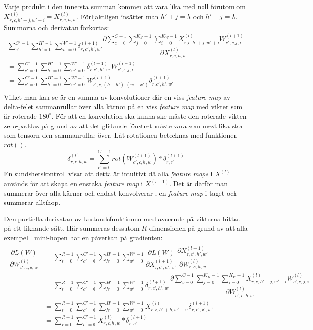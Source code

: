 \documentclass[a4paper,11pt,twoside]{article}
\newcommand*{\pd}[2]{\ensuremath{\dfrac{\partial #1}{\partial #2}}}
\begin{document}
Varje produkt i den innersta summan kommer att vara lika med noll förutom om $X^{(l)}_{r, c, h'+j, w'+i} = X^{(l)}_{r,c,h,w}$. Förljaktligen insätter man $h'+j = h$ och $h'+j = h$. Summorna och derivatan förkortas: \cite{webconv1} \cite{webconv2} \cite{webconv3}
\begin{multline}
\sum^{C'-1}_{c'} \sum^{H'-1}_{h'=0} \sum^{W'-1}_{w'=0} \delta^{(l+1)}_{r,c',h',w'} \pd{\sum^{C-1}_{c=0} \sum^{K_H-1}_{j=0} \sum^{K_W-1}_{i=0} X^{(l)}_{r, c, h'+j, w'+i}W^{(l+1)}_{c', c, j, i}}{X^{(l)}_{r,c,h,w}} \\
	 = \sum^{C'-1}_{c'=0} \sum^{H'-1}_{h'=0} \sum^{W'-1}_{w'=0} \delta^{(l+1)}_{r,c',h',w'} W^{(l+1)}_{c', c, j, i} \\
	 = \sum^{C'-1}_{c'=0} \sum^{H'-1}_{h'=0} \sum^{W'-1}_{w'=0} W^{(l+1)}_{c', c, (h-h'), (w-w')}  \delta^{(l+1)}_{r,c',h',w'}   \\
\end{multline}
Vilket man kan se är en summa av konvolutioner där en viss \textit{feature map} av delta-felet sammanrullar över alla kärnor på en viss \textit{feature map} med vikter som är roterade $180^\circ$. För att en konvolution ska kunna ske måste den roterade vikten zero-paddas på grund av att det glidande fönstret måste vara som mest lika stor som tensorn den sammanrullar över. Låt rotationen betecknas med funktionen $rot()$. \cite{webconv1} \cite{webconv2} \cite{webconv3}
\begin{equation}
\delta^{(l)}_{r,c,h,w} = \sum^{C'-1}_{c'=0} rot(W^{(l+1)}_{c',c,h,w}) * \delta^{(l+1)}_{r,c'}
\end{equation}
En sundshetskontroll visar att detta är intuitivt då alla \textit{feature maps} i $X^{(l)}$ används för att skapa en enstaka \textit{feature map} i $X^{(l+1)}$. Det är därför man summerar över alla kärnor och endast konvolverar i en \textit{feature map} i taget och summerar alltihop. \cite{cs231n}

Den partiella derivatan av kostandsfunktionen med avseende på vikterna hittas på ett liknande sätt. Här summeras dessutom $R$-dimensionen på grund av att alla exempel i mini-hopen har en påverkan på gradienten: \cite{cs231n} \cite{webconv1} \cite{webconv2} \cite{webconv3} 
\begin{align}
\begin{split}
	\pd{L(W)}{W^{(l)}_{c',c,h,w}}
		& = \sum^{R-1}_{r=0} \sum^{C'-1}_{c'=0} \sum^{H'-1}_{h'=0} \sum^{W'-1}_{w'=0} \pd{L(W)}{X^{(l+1)}_{r,c',h',w'}} \pd{X^{(l+1)}_{r,c',h',w'}}{W^{(l)}_{r,c,h,w}} \\
		& = \sum^{R-1}_{r=0} \sum_{c'=0}^{C'-1} \sum^{H'-1}_{h'=0} \sum^{W'-1}_{w'=0} \delta^{(l+1)}_{r,c',h',w'} \pd{\sum\limits^{C-1}_{c=0} \sum\limits^{K_H-1}_{j=0} \sum\limits^{K_W-1}_{i=0} X^{(l)}_{r, c, h'+j, w'+i}W^{(l)}_{c', c, j, i}}{W^{(l)}_{c',c,h,w}} \\
		& = \sum^{R-1}_{r=0} \sum^{C'-1}_{c'=0} \sum^{H'-1}_{h'=0} \sum^{W'-1}_{w'=0} X^{(l)}_{r, c, h'+h, w'+w} \delta^{(l+1)}_{r,c',h',w'} \\
		& = \sum^{R-1}_{r=0} \sum^{C'-1}_{c'=0} X^{(l)}_{r, c, h, w} * \delta^{(l+1)}_{r,c'} \\
\end{split}
\end{align}
\end{document}
